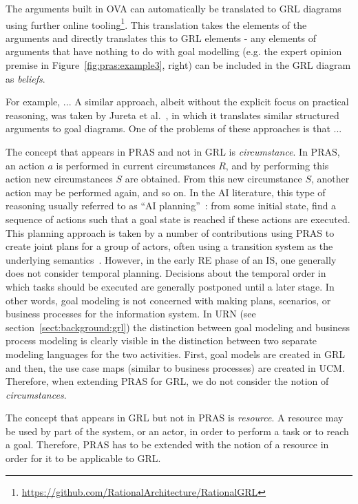 The arguments built in OVA can automatically be translated to GRL diagrams using further online tooling\footnote{\url{https://github.com/RationalArchitecture/RationalGRL}}. This translation takes the elements of the arguments and directly translates this to GRL elements - any elements of arguments that have nothing to do with goal modelling (e.g. the expert opinion premise in Figure~\ref{fig:pras:example3}, right) can be included in the GRL diagram as \emph{beliefs}. 


For example, ... A similar approach, albeit without the explicit focus on practical reasoning, was taken by Jureta et al.~\cite{}, in which it translates similar structured arguments to goal diagrams. One of the problems of these approaches is that ...

The concept that appears in PRAS and not in GRL is \emph{circumstance}. In PRAS, an action $a$ is performed in current circumstances $R$, and by performing this action new circumstances $S$ are obtained. From this new circumstance $S$, another action may be performed again, and so on. In the AI literature, this type of reasoning usually referred to as ``AI planning''~\cite{weld1999recent}: from some initial state, find a sequence of actions such that a goal state is reached if these actions are executed. This planning approach is taken by a number of contributions using PRAS to create joint plans for a group of actors, often using a transition system as the underlying semantics~\cite{medellin2014}. However, in the early RE phase of an IS, one generally does not consider temporal planning. Decisions about the temporal order in which tasks should be executed are generally postponed until a later stage. In other words, goal modeling is not concerned with making plans, scenarios, or business processes for the information system. In URN (see section~\ref{sect:background:grl}) the distinction between goal modeling and business process modeling is clearly visible in the distinction between two separate modeling languages for the two activities. First, goal models are created in GRL and then, the use case maps (similar to business processes) are created in UCM. Therefore, when extending PRAS for GRL, we do not consider the notion of \emph{circumstances}.

The concept that appears in GRL but not in PRAS is \emph{resource}. A resource may be used by part of the system, or an actor, in order to perform a task or to reach a goal. Therefore, PRAS has to be extended with the notion of a resource in order for it to be applicable to GRL. %

